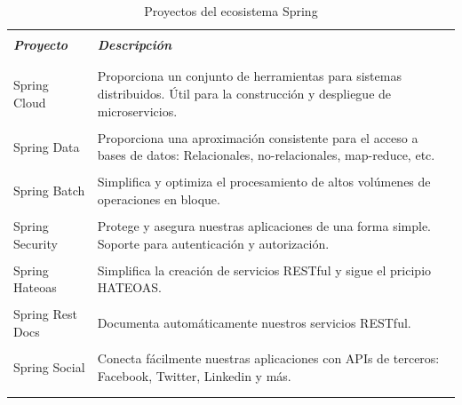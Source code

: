 		\begin{table}[H]
			\begin{tabular}{|p{4.75cm}|p{12cm}|} \hline
				 & \\
				\textit{\bfseries Proyecto} & \textit{\bfseries Descripción} \\
				 & \\ \hline
				 
				 & \\
				Spring Cloud & Proporciona un conjunto de herramientas para sistemas
				distribuidos. Útil para la construcción y despliegue de microservicios.\\
				 & \\
				 
				Spring Data & Proporciona una aproximación consistente para el acceso a
				bases de datos: Relacionales, no-relacionales, map-reduce, etc.\\
				& \\
				
				Spring Batch & Simplifica y optimiza el procesamiento de altos volúmenes
				de operaciones en bloque.\\
				& \\
				
				Spring Security & Protege y asegura nuestras aplicaciones de una forma
				simple.
				Soporte para autenticación y autorización.\\
				& \\
				
				Spring Hateoas & Simplifica la creación de servicios RESTful y sigue el
				pricipio HATEOAS.\\
				& \\
				
				Spring Rest Docs & Documenta automáticamente nuestros servicios RESTful.\\
				& \\
				
				Spring Social & Conecta fácilmente nuestras aplicaciones con APIs de
				terceros: Facebook, Twitter, Linkedin y más.\\
				& \\
				
				& \\ \hline
			\end{tabular}
			\caption{Proyectos del ecosistema Spring}
		\end{table}
		